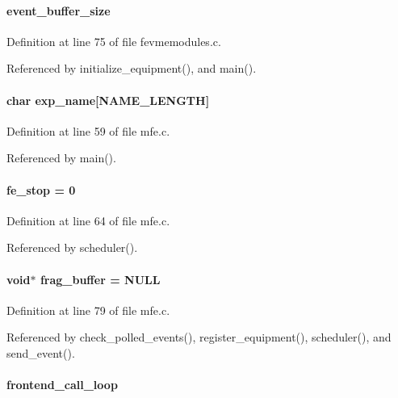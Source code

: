 \paragraph[{event\_\-buffer\_\-size}]{ {\bf event\_\-buffer\_\-size}}\hfill\label{mfe_8c_a4411d7db6f901c968b946ed659d202f6}


Definition at line 75 of file fevmemodules.c.

Referenced by initialize\_\-equipment(), and main().
\paragraph[{exp\_\-name}]{\setlength{\rightskip}{0pt plus 5cm}char {\bf exp\_\-name}\mbox{[}NAME\_\-LENGTH\mbox{]}}\hfill\label{mfe_8c_a11eee1a5e2cef985b90bdfe0bfc8cf76}


Definition at line 59 of file mfe.c.

Referenced by main().
\paragraph[{fe\_\-stop}]{ {\bf fe\_\-stop} = 0}\hfill\label{mfe_8c_a8432f49f703ed2d20248effc3125b0e1}


Definition at line 64 of file mfe.c.

Referenced by scheduler().
\paragraph[{frag\_\-buffer}]{\setlength{\rightskip}{0pt plus 5cm}void$\ast$ {\bf frag\_\-buffer} = NULL}\hfill\label{mfe_8c_aec32e8020846a8167a641ac52c76c5c4}


Definition at line 79 of file mfe.c.

Referenced by check\_\-polled\_\-events(), register\_\-equipment(), scheduler(), and send\_\-event().
\paragraph[{frontend\_\-call\_\-loop}]{ {\bf frontend\_\-call\_\-loop}}\hfill\label{mfe_8c_a0215c0a842a0e97fe65c7ef5fb7633a5}


